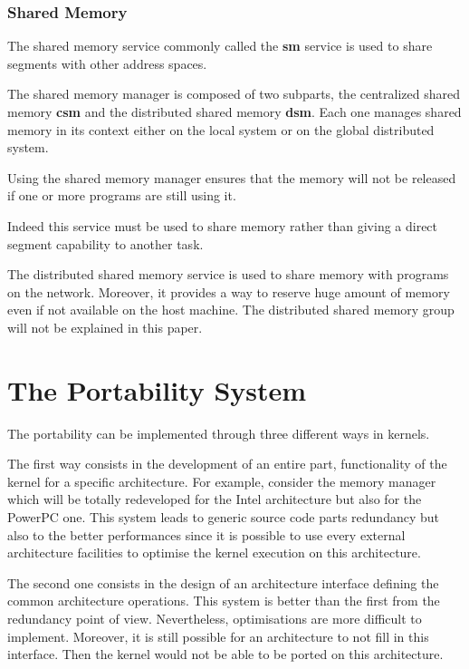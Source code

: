 \begin{multicols}{2}
\subsubsection{Shared Memory}

The shared memory service commonly called the \textbf{sm} service is used
to share segments with other address spaces.

The shared memory manager is composed of two subparts, the centralized
shared memory \textbf{csm} and the distributed shared memory \textbf{dsm}.
Each one manages shared memory in its context either on the local system
or on the global distributed system.

Using the shared memory manager ensures that the memory will not be released
if one or more programs are still using it.

Indeed this service must be used to share memory rather than giving
a direct segment capability to another task.

The distributed shared memory service is used to share memory with
programs on the network. Moreover, it provides a way to reserve huge amount
of memory even if not available on the host machine. The distributed shared
memory group will not be explained in this paper.

%
%

\section{The Portability System}

The portability can be implemented through three different ways in kernels.

The first way consists in the development of an entire part, functionality
of the kernel for a specific architecture. For example, consider the
memory manager which will be totally redeveloped for the Intel architecture
but also for the PowerPC one. This system leads to generic source code parts
redundancy but also to the better performances since it is possible
to use every external architecture facilities to optimise the kernel
execution on this architecture.

The second one consists in the design of an architecture interface defining
the common architecture operations. This system is better than the first
from the redundancy point of view. Nevertheless, optimisations are more
difficult to implement. Moreover, it is still possible for an architecture
to not fill in this interface. Then the kernel would not be able to be
ported on this architecture.


\end{multicols}
